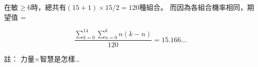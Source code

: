 \documentclass{article}
\begin{document}
\fontsize{15pt}{20pt}\selectfont

\begin{CJK}{UTF8}{bsmi} %
\noindent
在敏$\geq$6時，總共有$(15+1) \times 15 / 2 = 120$種組合。
而因為各組合機率相同，期望值 = 

\begin{displaymath}
\frac{\sum_{k=0}^{14}\sum_{n=0}^{k} n(k-n)}{120} = 15.166...
\end{displaymath}

註： 力量$\times$智慧是怎樣…

\end{CJK} %
\end{document}
